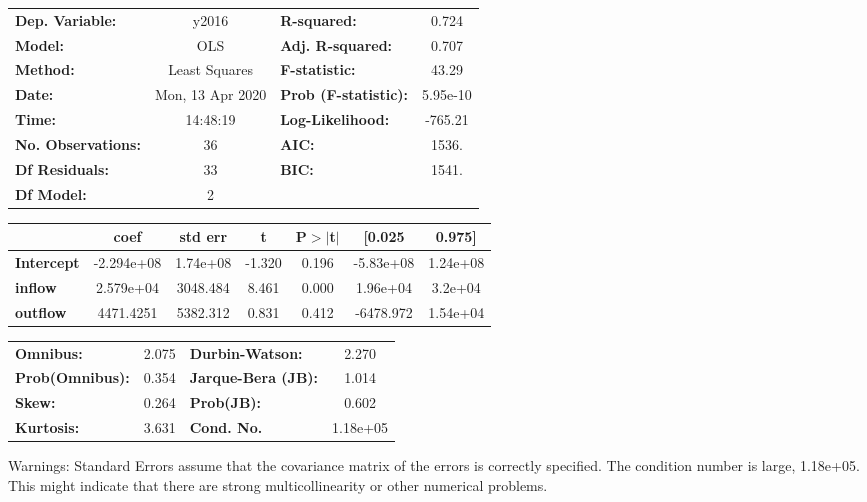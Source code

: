 \begin{center}
\begin{tabular}{lclc}
\toprule
\textbf{Dep. Variable:}    &      y2016       & \textbf{  R-squared:         } &     0.724   \\
\textbf{Model:}            &       OLS        & \textbf{  Adj. R-squared:    } &     0.707   \\
\textbf{Method:}           &  Least Squares   & \textbf{  F-statistic:       } &     43.29   \\
\textbf{Date:}             & Mon, 13 Apr 2020 & \textbf{  Prob (F-statistic):} &  5.95e-10   \\
\textbf{Time:}             &     14:48:19     & \textbf{  Log-Likelihood:    } &   -765.21   \\
\textbf{No. Observations:} &          36      & \textbf{  AIC:               } &     1536.   \\
\textbf{Df Residuals:}     &          33      & \textbf{  BIC:               } &     1541.   \\
\textbf{Df Model:}         &           2      & \textbf{                     } &             \\
\bottomrule
\end{tabular}
\begin{tabular}{lcccccc}
                   & \textbf{coef} & \textbf{std err} & \textbf{t} & \textbf{P$> |$t$|$} & \textbf{[0.025} & \textbf{0.975]}  \\
\midrule
\textbf{Intercept} &   -2.294e+08  &     1.74e+08     &    -1.320  &         0.196        &    -5.83e+08    &     1.24e+08     \\
\textbf{inflow}    &    2.579e+04  &     3048.484     &     8.461  &         0.000        &     1.96e+04    &      3.2e+04     \\
\textbf{outflow}   &    4471.4251  &     5382.312     &     0.831  &         0.412        &    -6478.972    &     1.54e+04     \\
\bottomrule
\end{tabular}
\begin{tabular}{lclc}
\textbf{Omnibus:}       &  2.075 & \textbf{  Durbin-Watson:     } &    2.270  \\
\textbf{Prob(Omnibus):} &  0.354 & \textbf{  Jarque-Bera (JB):  } &    1.014  \\
\textbf{Skew:}          &  0.264 & \textbf{  Prob(JB):          } &    0.602  \\
\textbf{Kurtosis:}      &  3.631 & \textbf{  Cond. No.          } & 1.18e+05  \\
\bottomrule
\end{tabular}
\end{center}

Warnings: \newline
 [1] Standard Errors assume that the covariance matrix of the errors is correctly specified. \newline
 [2] The condition number is large, 1.18e+05. This might indicate that there are \newline
 strong multicollinearity or other numerical problems.